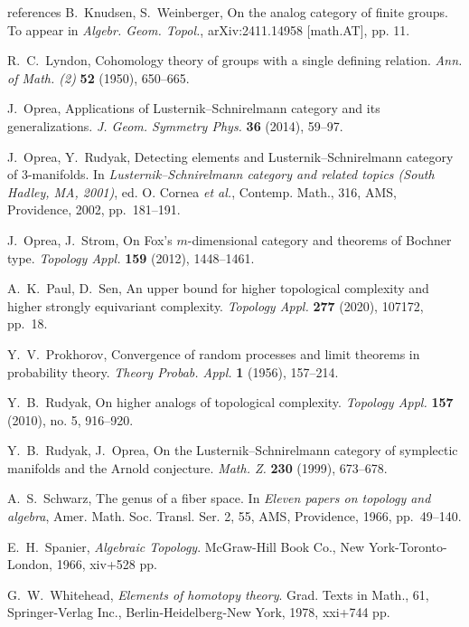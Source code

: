 \documentclass[amscd,amssymb,verbatim,11pt]{amsart}
\theoremstyle{plain}
\theoremstyle{definition}
\begin{document}
\begin{thebibliography}{references}
 B.~Knudsen, S.~Weinberger, On the analog category of finite groups. To appear in \emph{Algebr. Geom. Topol.}, arXiv:2411.14958 [math.AT], pp. 11.

 R.~C.~Lyndon, Cohomology theory of groups with a single defining relation. \emph{Ann. of Math. (2)} \textbf{52} (1950), 650--665.

 J.~Oprea, Applications of Lusternik--Schnirelmann category and its generalizations. \emph{J. Geom. Symmetry Phys.} \textbf{36} (2014), 59--97.

 J.~Oprea, Y.~Rudyak, Detecting elements and Lusternik--Schnirelmann category of $3$-manifolds. In \emph{Lusternik--Schnirelmann category and related topics (South Hadley, MA, 2001)}, ed. O. Cornea \emph{et al.}, Contemp. Math., 316, AMS, Providence, 2002, pp.~181--191.

 J.~Oprea, J.~Strom, On Fox's $m$-dimensional category and theorems of Bochner type. \emph{Topology Appl.} \textbf{159} (2012), 1448--1461.

 A.~K.~Paul, D.~Sen, An upper bound for higher topological complexity and higher strongly equivariant complexity. \emph{Topology Appl.} \textbf{277} (2020), 107172, pp.~18.

 Y.~V.~Prokhorov, Convergence of random processes and limit theorems in probability theory. \emph{Theory Probab. Appl.} \textbf{1} (1956), 157--214. 

 Y.~B.~Rudyak, On higher analogs of topological complexity. \textit{Topology Appl.} \textbf{157} (2010), no. 5, 916--920. 

 Y.~B.~Rudyak, J.~Oprea, On the Lusternik–Schnirelmann category of symplectic manifolds and the Arnold conjecture. \emph{Math. Z.} \textbf{230} (1999), 673--678.

 A.~S.~Schwarz, The genus of a fiber space. In \emph{Eleven papers on topology and algebra}, Amer. Math. Soc. Transl. Ser. 2, 55, AMS, Providence, 1966, pp.~49--140. 

 E.~H.~Spanier, \emph{Algebraic {T}opology}. McGraw-Hill Book Co., New York-Toronto-London, 1966, xiv+528 pp.

 G.~W.~Whitehead, \emph{Elements of homotopy theory}. Grad. Texts in Math., 61, Springer-Verlag Inc., Berlin-Heidelberg-New York, 1978, xxi+744 pp.
\end{thebibliography}
\end{document}
